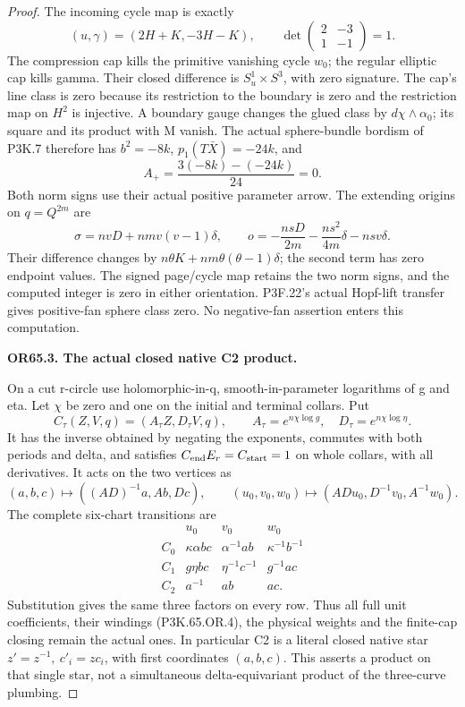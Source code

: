 \begin{proof}
The incoming cycle map is exactly
\[
 (u,\gamma)=(2H+K,-3H-K),\qquad
 \det\begin{pmatrix}2&-3\\1&-1\end{pmatrix}=1.
\]
The compression cap kills the primitive vanishing cycle \(w_0\);
the regular elliptic cap kills gamma. Their closed difference is
\(S^1_u\times S^3\), with zero signature. The cap's line class
is zero because its restriction to the boundary is zero and the
restriction map on \(H^2\) is injective. A boundary gauge changes
the glued class by \(d\chi\wedge\alpha_0\); its square and its
product with M vanish. The actual sphere-bundle bordism of P3K.7
therefore has \(b^2=-8k\), \(p_1(T\bar X)=-24k\), and
\[
              A_+=\frac{3(-8k)-(-24k)}{24}=0.        \tag{P3K.65.OR.8}
\]
Both norm signs use their actual positive parameter arrow. The
extending origins on \(q=Q^{2m}\) are
\[
 \sigma=nvD+nmv(v-1)\delta,\qquad
 o=-\frac{nsD}{2m}-\frac{ns^2}{4m}\delta-nsv\delta.
\]
Their difference changes by
\(n\theta K+nm\theta(\theta-1)\delta\); the second term has
zero endpoint values. The signed page/cycle map retains the two
norm signs, and the computed integer is zero in either orientation.
P3F.22's actual Hopf-lift transfer gives positive-fan sphere class
zero. No negative-fan assertion enters this computation.

\par\medskip\noindent\textbf{OR65.3. The actual closed native C2 product.}\par\nopagebreak[4]

On a cut r-circle use holomorphic-in-q, smooth-in-parameter
logarithms of g and eta. Let \(\chi\) be zero and one on the
initial and terminal collars. Put
\[
 C_\tau(Z,V,q)=(A_\tau Z,D_\tau V,q),\qquad
 A_\tau=e^{n\chi\log g},\quad D_\tau=e^{n\chi\log\eta}.
                                                               \tag{P3K.65.OR.9}
\]
It has the inverse obtained by negating the exponents, commutes
with both periods and delta, and satisfies
\(C_{\rm end}E_r=C_{\rm start}=1\) on whole collars, with all
derivatives. It acts on the two vertices as
\[
 (a,b,c)\mapsto((AD)^{-1}a,Ab,Dc),\qquad
 (u_0,v_0,w_0)\mapsto(ADu_0,D^{-1}v_0,A^{-1}w_0).
\]
The complete six-chart transitions are
\[
\begin{array}{c|ccc}
 &u_0&v_0&w_0\\ \hline
 C_0&\kappa\alpha bc&\alpha^{-1}ab&\kappa^{-1}b^{-1}\\
 C_1&g\eta bc&\eta^{-1}c^{-1}&g^{-1}ac\\
 C_2&a^{-1}&ab&ac.
\end{array}                                                   \tag{P3K.65.OR.10}
\]
Substitution gives the same three factors on every row. Thus all
full unit coefficients, their windings (P3K.65.OR.4), the physical
weights and the finite-cap closing remain the actual ones. In
particular C2 is a literal closed native star
\(z'=z^{-1},\ c'_i=zc_i\), with first coordinates \((a,b,c)\).
This asserts a product on that single star, not a simultaneous
delta-equivariant product of the three-curve plumbing.


\end{proof}
